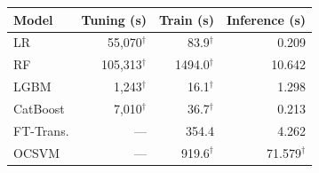 \begin{tabular}{l r r r}
\toprule
Model & Tuning (s) & Train (s) & Inference (s) \\
\midrule
LR         & 55,070$^{\dagger}$ & 83.9$^{\dagger}$ & 0.209 \\
RF         & 105,313$^{\dagger}$ & 1494.0$^{\dagger}$ & 10.642 \\
LGBM       & 1,243$^{\dagger}$ & 16.1$^{\dagger}$ & 1.298 \\
CatBoost   & 7,010$^{\dagger}$ & 36.7$^{\dagger}$ & 0.213 \\
FT-Trans.  & --- & 354.4 & 4.262 \\
OCSVM      & --- & 919.6$^{\dagger}$ & 71.579$^{\dagger}$ \\
\bottomrule
\end{tabular}
